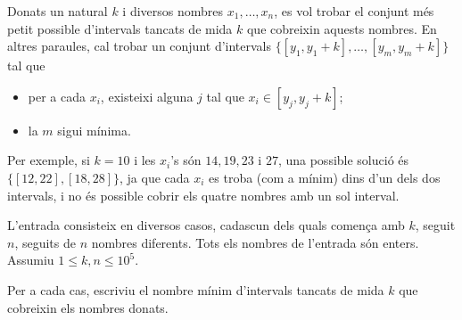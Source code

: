 

\Statement

Donats un natural $k$ i diversos nombres $x_1, \ldots, x_n$,
es vol trobar el conjunt més petit possible
d'intervals tancats de mida $k$ que cobreixin aquests nombres.
En altres paraules, cal trobar un conjunt d'intervals
$\{[y_1, y_1 + k], \dots, [y_m, y_m + k]\}$
tal que
\begin{itemize}
\item
per a cada $x_i$,
existeixi alguna $j$ tal que $x_i \in [y_j, y_j + k]$;
\item
la $m$ sigui mínima.
\end{itemize}
Per exemple, si $k=10$ i les $x_i$'s són $14, 19, 23$ i $27$,
una possible solució és
$\{[12, 22], [18, 28]\}$,
ja que cada $x_i$ es troba (com a mínim) dins d'un dels dos intervals,
i no és possible cobrir els quatre nombres amb un sol interval.


\Input

L'entrada consisteix en diversos casos, cadascun dels quals comença
amb $k$, seguit $n$, seguits de $n$ nombres diferents. Tots els
nombres de l'entrada són enters. Assumiu $1 \le k, n \le 10^5$.


\Output

Per a cada cas, escriviu el nombre mínim d'intervals tancats de mida
$k$ que cobreixin els nombres donats.

\Sample
